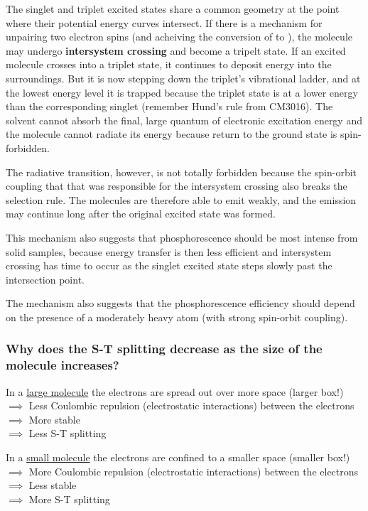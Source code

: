 \documentclass[a4paper,12pt,titlepage]{article}
\begin{document}
The singlet and triplet excited states share a common geometry at the point where their potential energy curves intersect. If there is a mechanism for unpairing two electron spins (and acheiving the conversion of  to \ce{ ^ ^}), the molecule may undergo \textbf{intersystem crossing} and become a tripelt state. If an excited molecule crosses into a triplet state, it continues to deposit energy into the surroundings. But it is now stepping down the triplet's vibrational ladder, and at the lowest energy level it is trapped because the triplet state is at a lower energy than the corresponding singlet (remember Hund's rule from CM3016). The solvent cannot absorb the final, large quantum of electronic excitation energy and the molecule cannot radiate its energy because return to the ground state is spin-forbidden.

The radiative transition, however, is not totally forbidden because the spin-orbit coupling that that was responsible for the intersystem crossing also breaks the selection rule. The molecules are therefore able to emit weakly, and the emission may continue long after the original excited state was formed.

This mechanism also suggests that phosphorescence should be most intense from solid samples, because energy transfer is then less efficient and intersystem crossing has time to occur as the singlet excited state steps slowly past the intersection point.

The mechanism also suggests that the phosphorescence efficiency should depend on the presence of a moderately heavy atom (with strong spin-orbit coupling).

\begin{frame}
\frametitle{Why does the S-T splitting decrease as the size of the molecule increases?}
In a \underline{large molecule} the electrons are spread out over more space (larger box!)\\
\hspace{5pt} \(\implies\) Less Coulombic repulsion (electrostatic interactions) between the electrons\\
\hspace{10pt} \(\implies\) More stable \\
\hspace{15pt} \(\implies\) Less S-T splitting\\
\medskip

In a \underline{small molecule} the electrons are confined to a smaller space (smaller box!)\\
\hspace{5pt} \(\implies\) More Coulombic repulsion (electrostatic interactions) between the electrons\\
\hspace{10pt} \(\implies\) Less stable\\
\hspace{15pt} \(\implies\) More S-T splitting
\end{frame}
\end{document}
